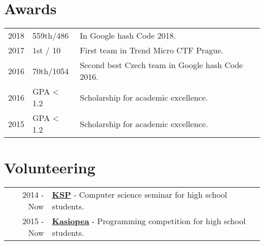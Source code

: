\documentclass[a4paper]{deedy-resume} %
\begin{document}
\begin{minipage}[t]{0.66\textwidth}
\sectionspace %


\section{Awards} 

\begin{tabular}{rll}
2018 & 559th/486 & In Google hash Code 2018. \\
2017 & 1st / 10 & First team in Trend Micro CTF Prague. \\
2016 & 70th/1054 & Second best Czech team in Google hash Code 2016. \\
2016 & GPA < 1.2 & Scholarship for academic excellence. \\
2015 & GPA < 1.2 & Scholarship for academic excellence. \\
\end{tabular}

\sectionspace %


\section{Volunteering} 

\begin{tabular}{rll}
2014 - Now & \href{https://ksp.mff.cuni.cz/}{\bf KSP} - Computer science seminar for high school students. \\
2015 - Now & \href{https://kasiopea.matfyz.cz/}{\bf Kasiopea} - Programming competition for high school students. \\
\end{tabular}

\sectionspace %


\end{minipage} %

\end{document}
